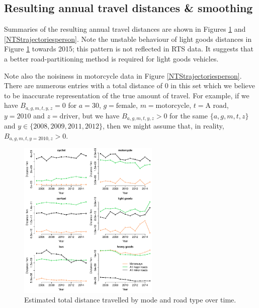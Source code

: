 \documentclass{article}
\begin{document}
\subsection{Resulting annual travel distances \& smoothing}

Summaries of the resulting annual travel distances are shown in Figures \ref{NTStrajectories} and \ref{NTStrajectoriesperson}. Note the unstable behaviour of light goods distances in Figure \ref{NTStrajectories} towards 2015; this pattern is not reflected in RTS data. It suggests that a better road-partitioning method is required for light goods vehicles. 

Note also the noisiness in motorcycle data in Figure \ref{NTStrajectoriesperson}. There are numerous entries with a total distance of 0 in this set which we believe to be inaccurate representation of the true amount of travel. For example, if we have $B_{a,g,m,t,y,z}=0$ for $a=30$, $g=\text{female}$, $m=\text{motorcycle}$, $t=\text{A road}$, $y=2010$ and $z=\text{driver}$, but we have $B_{a,g,m,t,y,z}>0$ for the same $\{a,g,m,t,z\}$ and $y\in\{2008,2009,2011,2012\}$, then we might assume that, in reality, $B_{a,g,m,t,y=2010,z}>0$.

\begin{figure}[H]
\centering
\includegraphics[width=0.6\textwidth]{NTStrajectories.pdf}
\caption{\small Estimated total distance travelled by mode and road type over time.}
\label{NTStrajectories}
\end{figure}
\end{document}
